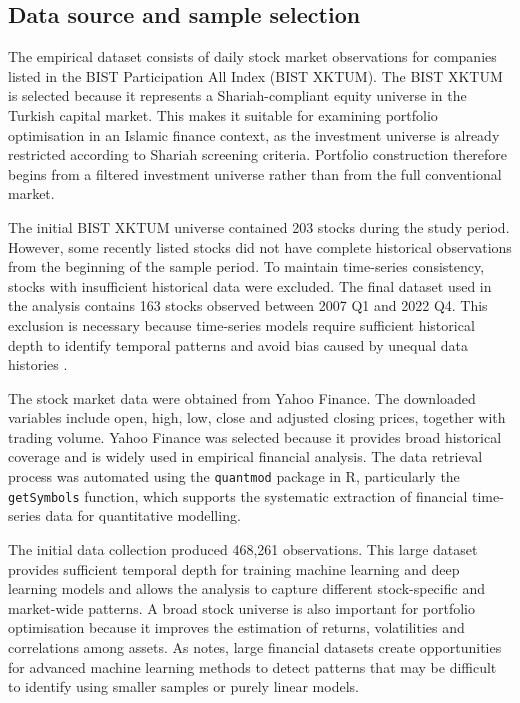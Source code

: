 \subsection{Data source and sample selection}

The empirical dataset consists of daily stock market observations for companies listed in the BIST Participation All Index (BIST XKTUM). The BIST XKTUM is selected because it represents a Shariah-compliant equity universe in the Turkish capital market. This makes it suitable for examining portfolio optimisation in an Islamic finance context, as the investment universe is already restricted according to Shariah screening criteria. Portfolio construction therefore begins from a filtered investment universe rather than from the full conventional market.

The initial BIST XKTUM universe contained 203 stocks during the study period. However, some recently listed stocks did not have complete historical observations from the beginning of the sample period. To maintain time-series consistency, stocks with insufficient historical data were excluded. The final dataset used in the analysis contains 163 stocks observed between 2007 Q1 and 2022 Q4. This exclusion is necessary because time-series models require sufficient historical depth to identify temporal patterns and avoid bias caused by unequal data histories \citep{lo2017adaptive}.

The stock market data were obtained from Yahoo Finance. The downloaded variables include open, high, low, close and adjusted closing prices, together with trading volume. Yahoo Finance was selected because it provides broad historical coverage and is widely used in empirical financial analysis. The data retrieval process was automated using the \texttt{quantmod} package in R, particularly the \texttt{getSymbols} function, which supports the systematic extraction of financial time-series data for quantitative modelling.

The initial data collection produced 468,261 observations. This large dataset provides sufficient temporal depth for training machine learning and deep learning models and allows the analysis to capture different stock-specific and market-wide patterns. A broad stock universe is also important for portfolio optimisation because it improves the estimation of returns, volatilities and correlations among assets. As \citet{heaton2017deep} notes, large financial datasets create opportunities for advanced machine learning methods to detect patterns that may be difficult to identify using smaller samples or purely linear models.

